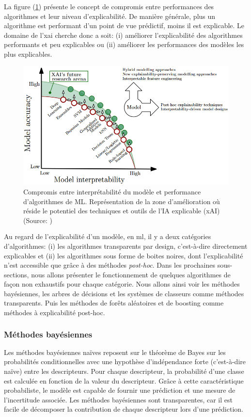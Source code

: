La figure (\ref{fig:xai-research}) présente le concept de compromis entre performances des algorithmes et leur niveau d'explicabilité. De manière générale, plus un algorithme est performant d'un point de vue prédictif, moins il est explicable. Le domaine de l'\gls{xai} cherche donc a soit: (i) améliorer l'explicabilité des algorithmes performants et peu explicables ou (ii) améliorer les performances des modèles les plus explicables.
\begin{figure}[!ht]
 \centering
 \includegraphics[width=1\textwidth]{figures/xai-research.png}
 \caption[Compromis entre interprétabilité et performances des algo de ML]{Compromis entre interprétabilité du modèle et performance d'algorithmes de ML. Représentation de la zone d'amélioration où réside le potentiel des techniques et outils de l'IA explicable (xAI) (Source: \cite{arrieta_explainable_2019})}
 \label{fig:xai-research}
\end{figure}

Au regard de l'explicabilité d'un modèle, en \gls{ml}, il y a deux catégories d'algorithmes: (i) les algorithmes transparents par design, c'est-à-dire directement explicables et (ii) les algorithmes sous forme de boites noires, dont l'explicabilité n'est accessible que grâce à des méthodes \textit{post-hoc}. Dans les prochaines sous-sections, nous allons présenter le fonctionnement de quelques algorithmes de façon non exhaustifs pour chaque catégorie. Nous allons ainsi voir les méthodes bayésiennes, les arbres de décisions et les systèmes de classeurs comme méthodes transparents. Puis les méthodes de forêts aléatoires et de boosting comme méthodes à explicabilité post-hoc.

\subsubsection{Méthodes bayésiennes}
Les méthodes bayésiennes naïves reposent sur le théorème de Bayes sur les probabilités conditionnelles avec une hypothèse d'indépendance forte (c'est-à-dire naïve) entre les descripteurs. Pour chaque descripteur, la probabilité d'une classe est calculée en fonction de la valeur du descripteur. Grâce à cette caractéristique probabiliste, le modèle est capable de fournir une prédiction et une mesure de l'incertitude associée. Les méthodes bayésiennes sont transparentes, car il est facile de décomposer la contribution de chaque descripteur lors d'une prédiction.

